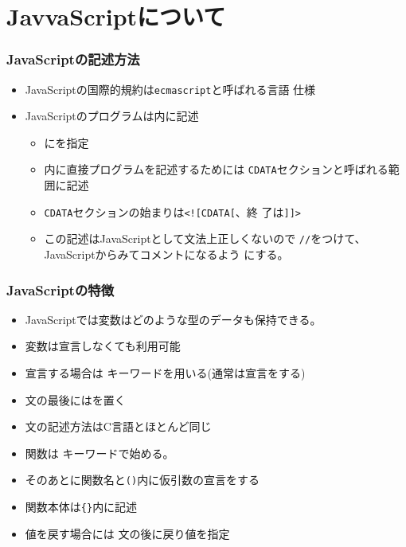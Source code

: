 

\frame{\maketitle}
\section{JavvaScriptについて}
\begin{frame}[containsverbatim]
 \frametitle{JavaScriptの記述方法}
 \begin{itemize}
  \item JavaScriptの国際的規約は\texttt{ecmascript}と呼ばれる言語
        仕様
  \item JavaScriptのプログラムは内に記述
        \begin{itemize}
         \item {}にを指定
         \item {}内に直接プログラムを記述するためには
               \texttt{CDATA}セクションと呼ばれる範囲に記述
         \item \texttt{CDATA}セクションの始まりは\texttt{<![CDATA[}、終
               了は\texttt{]]>}
         \item この記述はJavaScriptとして文法上正しくないので
               \texttt{//}をつけて、JavaScriptからみてコメントになるよう
               にする。
        \end{itemize}
 \end{itemize}
\end{frame}
\begin{frame}[containsverbatim]
 \frametitle{JavaScriptの特徴}
 \begin{itemize}
  \item JavaScriptでは変数はどのような型のデータも保持できる。
  \item 変数は宣言しなくても利用可能
  \item 宣言する場合は  キーワードを用いる(通常は宣言をする)
  \item 文の最後には\JSKey{;}を置く
  \item 文の記述方法はC言語とほとんど同じ
  \item 関数は  キーワードで始める。
  \item そのあとに関数名と\texttt{()}内に仮引数の宣言をする
  \item 関数本体は\texttt{\{\}}内に記述
  \item 値を戻す場合には 文の後に戻り値を指定
 \end{itemize}
\end{frame}
